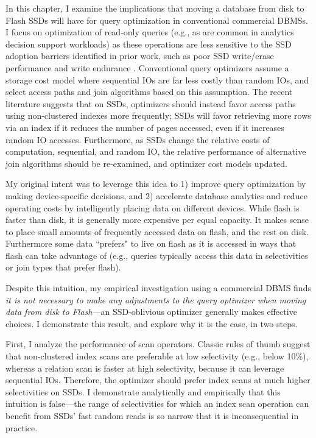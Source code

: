 In this chapter, I examine the implications that moving a database from disk to Flash SSDs will have for query optimization in conventional commercial DBMSs.
I focus on optimization of read-only queries (e.g., as are common in analytics decision support workloads) as these operations are less sensitive to the SSD adoption barriers identified in prior work, such as poor SSD write/erase performance \cite{Chen2009} and write endurance \cite{Roberts2009}.
Conventional query optimizers assume a storage cost model where sequential IOs are far less costly than random IOs, and select access paths and join algorithms based on this assumption.
The recent literature \cite{Baumann2010} suggests that on SSDs, optimizers should instead favor access paths using non-clustered indexes more frequently; SSDs will favor retrieving more rows via an index if it reduces the number of pages accessed, even if it increases random IO accesses.
Furthermore, as SSDs change the relative costs of computation, sequential, and random IO, the relative performance of alternative join algorithms should be re-examined, and optimizer cost models updated.

My original intent was to leverage this idea to 1) improve query optimization by making device-specific decisions, and 2) accelerate database analytics and reduce operating costs by intelligently placing data on different devices.
While flash is faster than disk, it is generally more expensive per equal capacity.
It makes sense to place small amounts of frequently accessed data on flash, and the rest on disk.
Furthermore some data ``prefers" to live on flash as it is accessed in ways that flash can take advantage of (e.g., queries typically access this data in selectivities or join types that prefer flash).

Despite this intuition, my empirical investigation using a commercial DBMS finds \emph{it is not necessary to make any adjustments to the query optimizer when moving data from disk to Flash}---an SSD-oblivious optimizer generally makes effective choices.
I demonstrate this result, and explore why it is the case, in two steps.

First, I analyze the performance of scan operators.  
Classic rules of thumb suggest that non-clustered index scans are preferable at low selectivity (e.g., below 10\%), whereas a relation scan is faster at high selectivity, because it can leverage sequential IOs.
Therefore, the optimizer should prefer index scans at much higher selectivities on SSDs.  
I demonstrate analytically and empirically that this intuition is false---the range of selectivities for which an index scan operation can benefit from SSDs' fast random reads is so narrow that it is inconsequential in practice.

